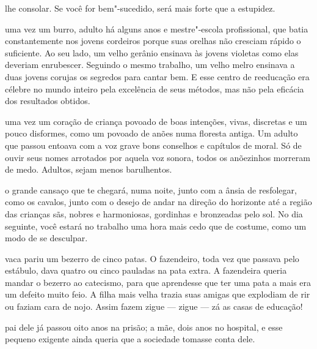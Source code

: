 \pagebreak
\thispagestyle{empty}

\movetooddpage


 lhe consolar. Se você for bem"-sucedido, será mais forte que a
estupidez.

\bigskip
\bigskip

 uma vez um burro, adulto há alguns anos e mestre"-escola
profissional, que batia constantemente nos jovens cordeiros porque suas
orelhas não cresciam rápido o suficiente. Ao seu lado, um velho gerânio
ensinava às jovens violetas como elas deveriam enrubescer. Seguindo o
mesmo trabalho, um velho melro ensinava a duas jovens corujas os
segredos para cantar bem. E esse centro de reeducação era célebre no
mundo inteiro pela excelência de seus métodos, mas não pela eficácia dos
resultados obtidos.

\bigskip
\bigskip

 uma vez um coração de criança povoado de boas intenções, vivas,
discretas e um pouco disformes, como um povoado de anões numa floresta
antiga. Um adulto que passou entoava com a voz grave bons conselhos e
capítulos de moral. Só de ouvir seus nomes arrotados por aquela voz
sonora, todos os anõezinhos morreram de medo. Adultos, sejam menos
barulhentos.

\bigskip
\bigskip


 o grande cansaço que te chegará, numa noite, junto com a ânsia de
resfolegar, como os cavalos, junto com o desejo de andar na direção do
horizonte até a região das crianças sãs, nobres e harmoniosas, gordinhas
e bronzeadas pelo sol. No dia seguinte, você estará no trabalho uma hora
mais cedo que de costume, como um modo de se desculpar.

\bigskip
\bigskip

 vaca pariu um bezerro de cinco patas. O fazendeiro, toda vez que
passava pelo estábulo, dava quatro ou cinco pauladas na pata extra. A
fazendeira queria mandar o bezerro ao catecismo, para que aprendesse que
ter uma pata a mais era um defeito muito feio. A filha mais velha trazia
suas amigas que explodiam de rir ou faziam cara de nojo. Assim fazem
zigue --- zigue --- zá as casas de educação!

\bigskip
\bigskip

 pai dele já passou oito anos na prisão; a mãe, dois anos no hospital,
e esse pequeno exigente ainda queria que a sociedade tomasse conta dele.

\bigskip
\bigskip

